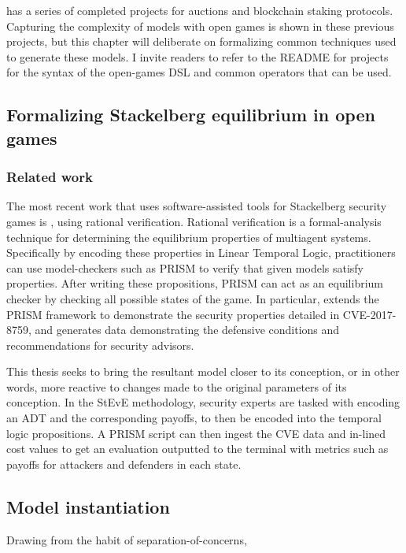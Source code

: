 \cite{20squares} has a series of completed projects for auctions and blockchain staking protocols. Capturing the complexity of models with open games is shown in these previous projects, but this chapter will deliberate on formalizing common techniques used to generate these models. I invite readers to refer to the README for \cite{20squares} projects for the syntax of the open-games DSL and common operators that can be used. 

\subsection{Formalizing Stackelberg equilibrium in open games}

\subsubsection{Related work}
The most recent work that uses software-assisted tools for Stackelberg security games is \cite{Phetmanee2024}, using rational verification. Rational verification is a formal-analysis technique for determining the equilibrium properties of multiagent systems. Specifically by encoding these properties in Linear Temporal Logic, practitioners can use model-checkers such as PRISM to verify that given models satisfy properties. After writing these propositions, PRISM can act as an equilibrium checker by checking all possible states of the game. In particular, \cite{Phetmanee2024} extends the PRISM framework to demonstrate the security properties detailed in CVE-2017-8759, and generates data demonstrating the defensive conditions and recommendations for security advisors. 

This thesis seeks to bring the resultant model closer to its conception, or in other words, more reactive to changes made to the original parameters of its conception. In the StEvE methodology, security experts are tasked with encoding an ADT and the corresponding payoffs, to then be encoded into the temporal logic propositions. A PRISM script can then ingest the CVE data and in-lined cost values to get an evaluation outputted to the terminal with metrics such as payoffs for attackers and defenders in each state.


\subsection{Model instantiation}
Drawing from the habit of separation-of-concerns, 
